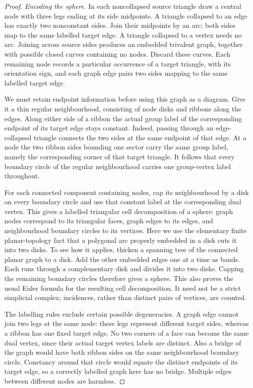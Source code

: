 \begin{proof}
\textit{Encoding the sphere.}
In each noncollapsed source triangle draw a central node with three
legs ending at its side midpoints.  A triangle collapsed to an edge
has exactly two nonconstant sides.  Join their midpoints by an arc;
both sides map to the same labelled target edge.  A triangle
collapsed to a vertex needs no arc.  Joining across source sides
produces an embedded trivalent graph, together with possible closed
curves containing no nodes.  Discard these curves.  Each remaining
node records a particular occurrence of a target triangle, with
its orientation sign, and each graph edge pairs two sides mapping
to the same labelled target edge.

We must retain endpoint information before using this graph as a
diagram.  Give it a thin regular neighbourhood, consisting of node
disks and ribbons along the edges.  Along either side of a ribbon
the actual group label of the corresponding endpoint of its target
edge stays constant.  Indeed, passing through an edge-collapsed
triangle connects the two sides at the same endpoint of that
edge.  At a node the two ribbon sides bounding one sector carry
the same group label, namely the corresponding corner of that
target triangle.  It follows that every boundary circle of the
regular neighbourhood carries one group-vertex label throughout.

For each connected component containing nodes, cap its neighbourhood
by a disk on every boundary circle and use that constant label at
the corresponding dual vertex.  This gives a labelled triangular
cell decomposition of a sphere: graph nodes correspond to its
triangular faces, graph edges to its edges, and neighbourhood
boundary circles to its vertices.  Here we use the elementary finite
planar-topology fact that a polygonal arc properly embedded in a disk cuts it into two disks.
To see how it applies, thicken a spanning tree of the connected
planar graph to a disk.  Add the other embedded edges one at a time
as bands.
Each runs through a complementary disk and divides it into two
disks.  Capping the remaining boundary circles therefore gives a
sphere.  This also proves the usual Euler formula for the resulting
cell decomposition.  It need not be a strict simplicial complex;
incidences, rather than distinct pairs of vertices, are counted.

The labelling rules exclude certain possible degeneracies.  A
graph edge cannot join two legs at the same node: these legs
represent different target sides, whereas a ribbon has one fixed
target edge.  No two corners of a face can become the same dual
vertex, since their actual target vertex labels are distinct.
Also a bridge of the graph would have both ribbon sides on the
same neighbourhood boundary circle.  Constancy around that circle
would equate the distinct endpoints of its target edge, so a
correctly labelled graph here has no bridge.  Multiple edges
between different nodes are harmless.


\end{proof}
